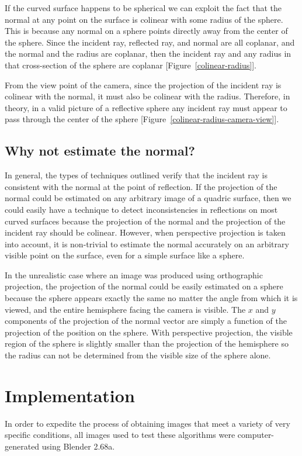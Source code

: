 \documentclass{thesis}
\begin{document}
If the curved surface happens to be spherical we can exploit the fact that the normal at any point on the surface is colinear with some radius of the sphere. This is because any normal on a sphere points directly away from the center of the sphere. Since the incident ray, reflected ray, and normal are all coplanar, and the normal and the radius are coplanar, then the incident ray and any radius in that cross-section of the sphere are coplanar [Figure~\ref{colinear-radius}].

From the view point of the camera, since the projection of the incident ray is colinear with the normal, it must also be colinear with the radius. Therefore, in theory, in a valid picture of a reflective sphere any incident ray must appear to pass through the center of the sphere [Figure~\ref{colinear-radius-camera-view}].

\section{Why not estimate the normal?}
In general, the types of techniques outlined verify that the incident ray is consistent with the normal at the point of reflection. If the projection of the normal could be estimated on any arbitrary image of a quadric surface, then we could easily have a technique to detect inconsistencies in reflections on most curved surfaces because the projection of the normal and the projection of the incident ray should be colinear. However, when perspective projection is taken into account, it is non-trivial to estimate the normal accurately on an arbitrary visible point on the surface, even for a simple surface like a sphere.

In the unrealistic case where an image was produced using orthographic projection, the projection of the normal could be easily estimated on a sphere because the sphere appears exactly the same no matter the angle from which it is viewed, and the entire hemisphere facing the camera is visible. The $x$ and $y$ components of the projection of the normal vector are simply a function of the projection of the position on the sphere. With perspective projection, the visible region of the sphere is slightly smaller than the projection of the hemisphere so the radius can not be determined from the visible size of the sphere alone.

\chapter{Implementation}
In order to expedite the process of obtaining images that meet a variety of very specific conditions, all images used to test these algorithms were computer-generated using Blender 2.68a.
\end{document}
